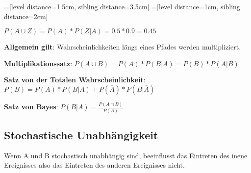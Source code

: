 \documentclass[STS.tex]{subfiles}
\begin{document}
=[level distance=1.5cm, sibling distance=3.5cm]
=[level distance=1cm, sibling distance=2cm]

$
P(A \cup Z) = P(A) * P(Z|A)
=
0.5 * 0.9 = 0.45
$

\textbf{Allgemein gilt}: Wahrscheinlichkeiten längs eines Pfades werden multipliziert.


\textbf{Multiplikationssatz}:
$
P(A \cup B) = P(A) * P(B|A) = P(B) * P(A|B)$

\textbf{Satz von der Totalen Wahrscheinlichkeit}:
$
P(B)=P(A)*P(B|A)+P( \overline{A}) * P(B| \overline{A})
$

\textbf{Satz von Bayes}: $ P(B|A) = \frac{P (A \cap B)}{P (A) }$


\subsection{Stochastische Unabhängigkeit}
Wenn A und B stochastisch unabhängig sind, beeinflusst das Eintreten des inene Ereignisses also das Eintreten des anderen Ereignisses nicht.
\end{document}
